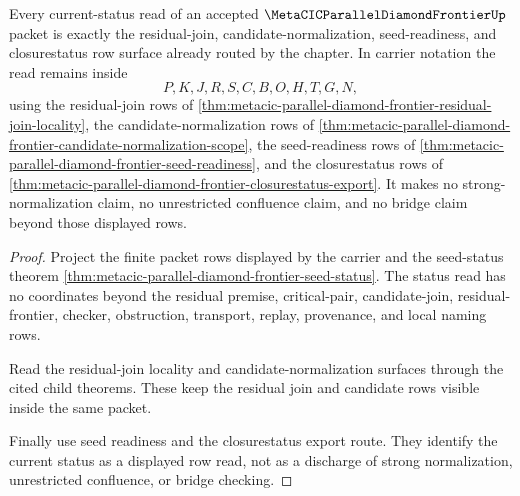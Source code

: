 \begin{theorem}
\label{thm:metacic-parallel-diamond-frontier-current-status-reader}
Every current-status read of an accepted $\MetaCICParallelDiamondFrontierUp$ packet is exactly the residual-join, candidate-normalization, seed-readiness, and closurestatus row surface already routed by the chapter. In carrier notation the read remains inside
$$
P,K,J,R,S,C,B,O,H,T,G,N,
$$
using the residual-join rows of \autoref{thm:metacic-parallel-diamond-frontier-residual-join-locality}, the candidate-normalization rows of \autoref{thm:metacic-parallel-diamond-frontier-candidate-normalization-scope}, the seed-readiness rows of \autoref{thm:metacic-parallel-diamond-frontier-seed-readiness}, and the closurestatus rows of \autoref{thm:metacic-parallel-diamond-frontier-closurestatus-export}. It makes no strong-normalization claim, no unrestricted confluence claim, and no bridge claim beyond those displayed rows.
\end{theorem}
\begin{proof}
Project the finite packet rows displayed by the carrier and the seed-status theorem \autoref{thm:metacic-parallel-diamond-frontier-seed-status}. The status read has no coordinates beyond the residual premise, critical-pair, candidate-join, residual-frontier, checker, obstruction, transport, replay, provenance, and local naming rows.

Read the residual-join locality and candidate-normalization surfaces through the cited child theorems. These keep the residual join and candidate rows visible inside the same packet.

Finally use seed readiness and the closurestatus export route. They identify the current status as a displayed row read, not as a discharge of strong normalization, unrestricted confluence, or bridge checking.
\end{proof}
